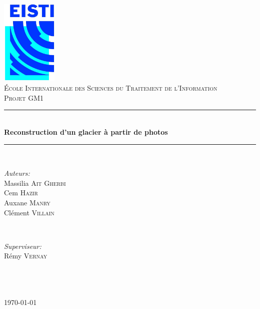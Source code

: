 \newcommand{\HRule}{\rule{\linewidth}{0.5mm}}

\begin{titlepage}
	\begin{center}
	
	\includegraphics[width=0.2\textwidth]{contents/img/logo.jpg}~\\[1cm]
	
	\textsc{\LARGE École Internationale des Sciences du Traitement de l'Information}\\[1.5cm]
	
	\textsc{\Large Projet GM1}\\[0.5cm]
	
	\HRule \\[0.4cm]
	{ \huge \bfseries Reconstruction d’un glacier à partir de photos
 \\[0.4cm] }
	
	\HRule \\[1.5cm]
	
	\noindent
	\begin{minipage}{0.4\textwidth}
		\begin{flushleft} \large
			\emph{Auteurs:}\\
			Massilia \textsc{Ait Gherbi} \\
			Cem \textsc{Hazir} \\
			Auxane \textsc{Manry} \\
			Clément \textsc{Villain}
		\end{flushleft}
	\end{minipage}
	~
	\begin{minipage}{0.4\textwidth}
		\begin{flushright} \large
			\emph{Superviseur:} \\
			Rémy \textsc{Vernay} \\
			~ \\
			~\\
			~\\
		\end{flushright}
	\end{minipage}

	\vfill

	{\large \today}
	\end{center}
\end{titlepage}
